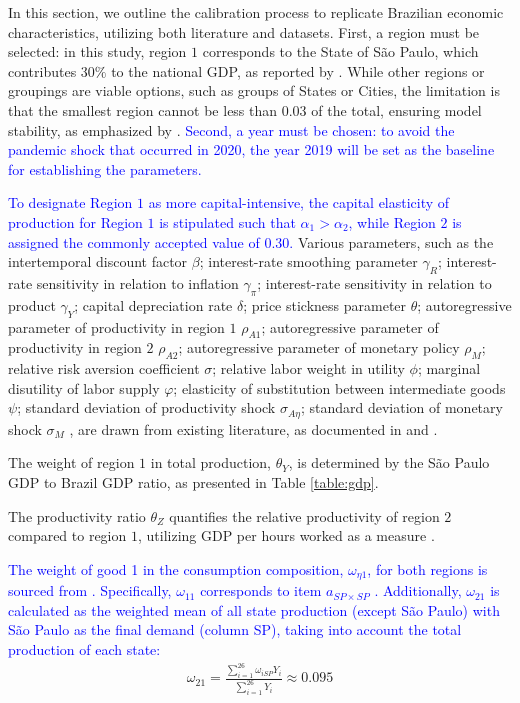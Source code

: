 \documentclass[../thesis.tex]{subfiles}
\begin{document}
In this section, we outline the calibration process to replicate Brazilian economic characteristics, utilizing both literature and datasets. First, a region must be selected: in this study, region $1$ corresponds to the State of São Paulo, which contributes $30\%$ to the national GDP, as reported by \textcite{ibge_produto_2024}. While other regions or groupings are viable options, such as groups of States or Cities, the limitation is that the smallest region cannot be less than $0.03$ of the total, ensuring model stability, as emphasized by \textcite{konopkova_pitfalls_2019}. \textcolor{blue}{Second, a year must be chosen: to avoid the pandemic shock that occurred in 2020, the year 2019 will be set as the baseline for establishing the parameters.}

\textcolor{blue}{To designate Region $1$ as more capital-intensive, the capital elasticity of production for Region $1$ is stipulated such that $\alpha_{1} > \alpha_{2}$, while Region $2$ is assigned the commonly accepted value of $0.30$.} Various parameters, such as the 
intertemporal discount factor $\beta$; 
interest-rate smoothing parameter $\gamma_{R}$; 
interest-rate sensitivity in relation to inflation $\gamma_{\pi}$; 
interest-rate sensitivity in relation to product $\gamma_{Y}$; 
capital depreciation rate $\delta$; 
price stickness parameter $\theta$;
autoregressive parameter of productivity in region $1$ $\rho_{A1}$;
autoregressive parameter of productivity in region $2$ $\rho_{A2}$;
autoregressive parameter of monetary policy $\rho_{M}$;
relative risk aversion coefficient $\sigma$;
relative labor weight in utility $\phi$;
marginal disutility of labor supply $\varphi$;
elasticity of substitution between intermediate goods $\psi$;
standard deviation of productivity shock $\sigma_{A\eta}$;
standard deviation of monetary shock $\sigma_{M}$
, are drawn from existing literature, as documented in \textcite{costa_junior_understanding_2016} and \textcite{pereira_rbc_2021}.

The weight of region $1$ in total production, $\theta_{Y}$, is determined by the São Paulo GDP to Brazil GDP ratio, as presented in Table \eqref{table:gdp}.

The productivity ratio $\theta_{Z}$ quantifies the relative productivity of region $2$ compared to region $1$, utilizing GDP per hours worked as a measure \cite{krugman_defining_1997}. 

\textcolor{blue}{The weight of good 1 in the consumption composition, $\omega_{\eta 1}$, for both regions is sourced from \textcite[Table 3, p.442]{haddad_matriz_2017}. Specifically, $\omega_{11}$ corresponds to item $a_{SP\times SP}$ \label{eq:omega-e1}. Additionally, $\omega_{21}$ is calculated as the weighted mean of all state production (except São Paulo) with São Paulo as the final demand (column SP), taking into account the total production of each state:}
\begin{align}
	\omega_{21} = \frac{\sum_{i=1}^{26} \omega_{iSP} Y_i}{\sum_{i=1}^{26} Y_i} \approx 0.095 \label{eq:omega-e2}
\end{align}
\end{document}
